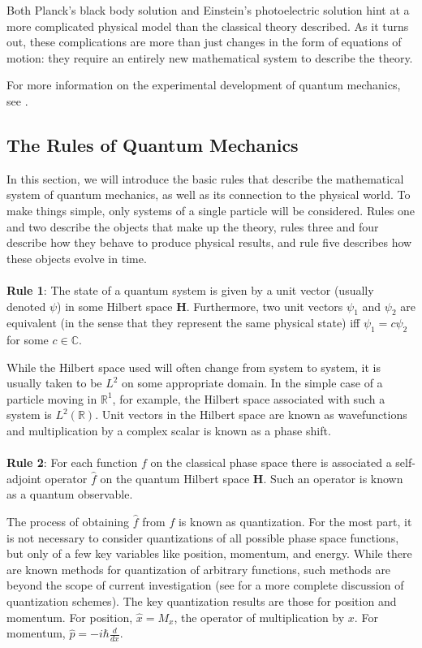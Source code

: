 Both Planck's black body solution and Einstein's photoelectric solution hint at
a more complicated physical model than the classical theory described.
As it turns out, these complications are more than just changes in the form of
equations of motion: they require an entirely new mathematical system to
describe the theory.

For more information on the experimental development of quantum mechanics, see
\cite[p. 1-16]{Hall2013}.

\subsection{The Rules of Quantum Mechanics}

In this section, we will introduce the basic rules that describe the
mathematical system of quantum mechanics, as well as its connection to the
physical world.  To make things simple, only systems of a single particle will
be considered. Rules one and two describe the objects that make up the
theory, rules three and four describe how they behave to produce physical
results, and rule five describes how these objects evolve in
time.\cite[p. 64]{Hall2013}
\\
\\
\textbf{Rule 1}: The state of a quantum system is given by a unit vector
(usually denoted $\psi$) in some Hilbert space \textbf{H}. Furthermore, two
unit vectors $\psi_1$ and $\psi_2$ are equivalent (in the sense that they represent
the same physical state) iff $\psi_1 = c\psi_2$ for some $c \in \mathbb{C}$.

While the Hilbert space used will often change from system to system, it is
usually taken to be $L^2$ on some appropriate domain. In the simple case of a
particle moving in $\mathbb{R}^1$, for example, the Hilbert space associated
with such a system is $L^2(\mathbb{R})$.
Unit vectors in the Hilbert space are known as wavefunctions and multiplication
by a complex scalar is known as a phase shift.
\\
\\
\textbf{Rule 2}: For each function $f$ on the classical phase space there is
associated a self-adjoint operator $\hat{f}$ on the quantum Hilbert space
\textbf{H}. Such an operator is known as a quantum observable.

The process of obtaining $\hat{f}$ from $f$ is known as quantization. For the
most part, it is not necessary to consider quantizations of all possible phase
space functions, but only of a few key variables like position,
momentum, and energy. While there are known methods for quantization of
arbitrary functions, such methods are beyond the scope of current investigation
(see \cite[p.255-275]{Hall2013} for a more complete discussion of quantization
schemes).  The key quantization results are those for position and momentum. For
position, $\hat{x} = M_x$, the operator of multiplication by $x$. For momentum,
$\hat{p} = -i\hbar
\frac{d}{dx}$.

